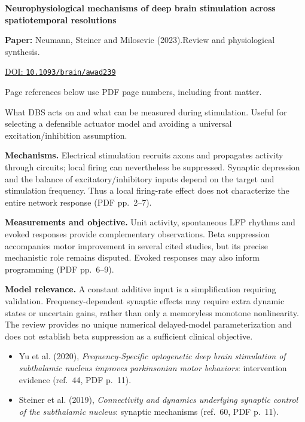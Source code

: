 

{\Large\bfseries Neurophysiological mechanisms of deep brain stimulation across spatiotemporal resolutions\par}

\textbf{Paper:} Neumann, Steiner and Milosevic (2023).\quad Review and physiological synthesis.\par
\href{https://doi.org/10.1093/brain/awad239}{DOI: \nolinkurl{10.1093/brain/awad239}}\par
{\footnotesize Page references below use PDF page numbers, including front matter.}

What DBS acts on and what can be measured during stimulation. Useful for selecting a defensible actuator model and avoiding a universal excitation/inhibition assumption.

\textbf{Mechanisms.} Electrical stimulation recruits axons and propagates activity through circuits; local firing can nevertheless be suppressed. Synaptic depression and the balance of excitatory/inhibitory inputs depend on the target and stimulation frequency. Thus a local firing-rate effect does not characterize the entire network response (PDF pp.~2--7).

\textbf{Measurements and objective.} Unit activity, spontaneous LFP rhythms and evoked responses provide complementary observations. Beta suppression accompanies motor improvement in several cited studies, but its precise mechanistic role remains disputed. Evoked responses may also inform programming (PDF pp.~6--9).

\textbf{Model relevance.} A constant additive input is a simplification requiring validation. Frequency-dependent synaptic effects may require extra dynamic states or uncertain gains, rather than only a memoryless monotone nonlinearity. The review provides no unique numerical delayed-model parameterization and does not establish beta suppression as a sufficient clinical objective.

\begin{itemize}
\item Yu et al. (2020), \emph{Frequency-Specific optogenetic deep brain stimulation of subthalamic nucleus improves parkinsonian motor behaviors}: intervention evidence (ref.~44, PDF p.~11).
\item Steiner et al. (2019), \emph{Connectivity and dynamics underlying synaptic control of the subthalamic nucleus}: synaptic mechanisms (ref.~60, PDF p.~11).
\end{itemize}


